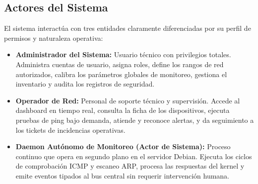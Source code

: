 \documentclass[12pt,a4paper]{report}
\begin{document}
\subsection{Actores del Sistema}

El sistema interactúa con tres entidades claramente diferenciadas por su perfil de permisos y naturaleza operativa:

\begin{itemize}
  \item \textbf{Administrador del Sistema:} Usuario técnico con privilegios totales. Administra cuentas de usuario, asigna roles, define los rangos de red autorizados, calibra los parámetros globales de monitoreo, gestiona el inventario y audita los registros de seguridad.
  \item \textbf{Operador de Red:} Personal de soporte técnico y supervisión. Accede al dashboard en tiempo real, consulta la ficha de los dispositivos, ejecuta pruebas de ping bajo demanda, atiende y reconoce alertas, y da seguimiento a los tickets de incidencias operativas.
  \item \textbf{Daemon Autónomo de Monitoreo (Actor de Sistema):} Proceso continuo que opera en segundo plano en el servidor Debian. Ejecuta los ciclos de comprobación ICMP y escaneo ARP, procesa las respuestas del kernel y emite eventos tipados al bus central sin requerir intervención humana.
\end{itemize}
\end{document}
